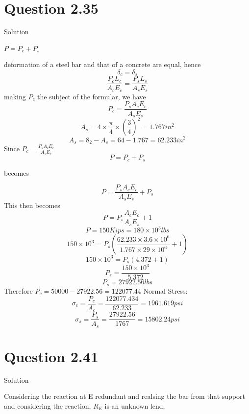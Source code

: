 \documentclass{article}
\begin{document}
\section*{Question 2.35}
\begin{center} Solution\end{center}
\begin{center}$ P = P_{c} + P_{s}$\end{center}
deformation of a steel bar and that of a concrete are equal, hence
\[\delta_{c} = \delta_{s}\]
\[\frac{P_{c}L_{c}}{A_{c}E_{c}} = \frac{P_{s}L_{s}}{A_{s}E_{s}}\]
making $P_{c}$ the subject of the formular, we have
\[P_{c} = \frac{P_{s}A_{c}E_{c}}{A_{s}E_{s}}\]
\[A_{s} = 4\times\frac{\pi}{4} \times(\frac{3}{4})^{2} = 1.767in^{2}\]
\[A_{s} = 8_{2} - A_{s}= 64 - 1.767 = 62.233in^{2}\]
Since $P_{c} = \frac{P_{s}A_{c}E_{c}}{A_{s}E_{s}}$
\[P = P_{c} + P_{s}\]
\begin{center} becomes\end{center}
\[P = \frac{P_{s}A_{c}E_{c}}{A_{s}E_{s}} + P_{s}\]
This then becomes
\[P = P_{s}\frac{A_{c}E_{c}}{A_{s}E_{s}} + 1\]
\[P = 150Kips = 180 \times 10^{3}lbs\]
\[150\times10^{3} = P_{s}(\frac{62.233\times3.6\times10^{6}}{1.767\times29\times10^{6}} + 1)\]
\[150 \times 10^{3} = P_{s}(4.372 + 1)\]
\[P_{s} = \frac{150\times10^{3}}{5.372}\]
\[P_{s} = 27922.56lbs\]
Therefore $P_{c} = 50000 - 27922.56 = 122077.44$
Normal Stress:
\[\sigma_{c} = \frac{P_{c}}{A_{c}} = \frac{122077.434}{62.233} = 1961.619psi\]
\[\sigma_{s} = \frac{P_{s}}{A_{s}} = \frac{27922.56}{1767} = 15802.24psi\]




\section*{Question 2.41}
\begin{center} Solution\end{center}
Considering the reaction at E redundant and realsing the bar from that support and considering the reaction, $R_{E}$ is an unknown lend,
\end{document}

